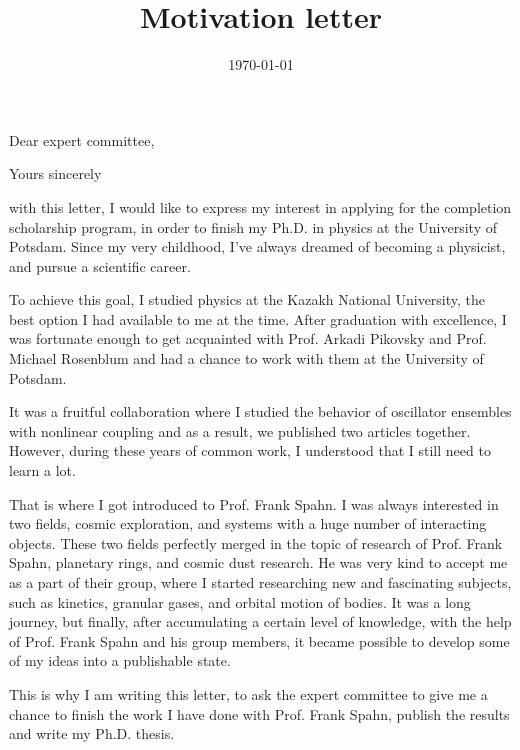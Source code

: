 \documentclass[11pt,a4paper,roman]{moderncv}        %
\title{Motivation letter}                               %
\begin{document}
\date{\today}
\opening{Dear expert committee,}
\closing{Yours sincerely}
\makelettertitle

with this letter, I would like to express my interest in applying for the completion scholarship program,
in order to finish my Ph.D. in physics at the University of Potsdam. Since my very childhood,
I’ve always dreamed of becoming a physicist, and pursue a scientific career.

To achieve this goal, I studied physics at the Kazakh National University,
the best option I had available to me at the time. After graduation with excellence, 
I was fortunate enough to get acquainted with Prof. Arkadi Pikovsky and Prof. Michael Rosenblum and
had a chance to work with them at the University of Potsdam.

It was a fruitful collaboration where I studied the behavior of oscillator ensembles with nonlinear coupling
and as a result, we published two articles together. However, during these years of common work,
I understood that I still need to learn a lot.

That is where I got introduced to Prof. Frank Spahn. I was always interested in two fields, cosmic exploration,
and systems with a huge number of interacting objects. These two fields perfectly merged in the topic of research of
Prof. Frank Spahn, planetary rings, and cosmic dust research. He was very kind to accept me as a part of their group,
where I started researching new and fascinating subjects, such as kinetics, granular gases, and orbital motion of bodies.
It was a long journey, but finally, after accumulating a certain level of knowledge, with the help of Prof. Frank Spahn
and his group members, it became possible to develop some of my ideas into a publishable state. 

This is why I am writing this letter, to ask the expert committee to give me a chance to finish the work
I have done with Prof. Frank Spahn, publish the results and write my Ph.D. thesis.

\vspace{0.5cm}


\makeletterclosing
\end{document}
